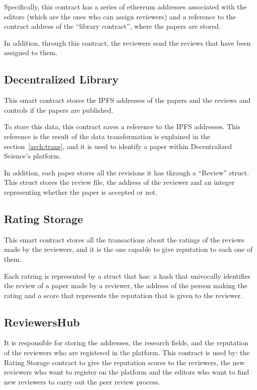 Specifically, this contract has a series of ethereum addresses associated with
the editors (which are the ones who can assign reviewers) and a reference to the
contract address of the ``library contract'', where the papers are stored.

In addition, through this contract, the reviewers send the reviews that have
been assigned to them.

\subsection*{Decentralized Library}
\label{sec:decentr-libr}

This smart contract stores the IPFS addresses of the papers and the reviews and
controls if the papers are published.

To store this data, this contract saves a reference to the IPFS addresses. This
reference is the result of the data transformation is explained in the
section~\ref{arch:trans}, and it is used to identify a paper within
Decentralized Science's platform.

In addition, each paper stores all the revisions it has through a ``Review''
struct. This struct stores the review file, the address of the reviewer and an
integer representing whether the paper is accepted or not.

\subsection*{Rating Storage}
\label{sec:rating-storage}

This smart contract stores all the transactions about the ratings of the reviews
made by the reviewers, and it is the one capable to give reputation to each one
of them.

Each ratring is represented by a struct that has: a hash that univocally
identifies the review of a paper made by a reviewer, the address of the person
making the rating and a score that represents the reputation that is given to
the reviewer.

\subsection*{ReviewersHub}
\label{sec:reviewershub}

It is responsible for storing the addresses, the research fields, and the
reputation of the reviewers who are registered in the platform. This contract is
used by: the Rating Storage contract to give the reputation scores to the
reviewers, the new reviewers who want to register on the platform and the
editors who want to find new reviewers to carry out the peer review process.


